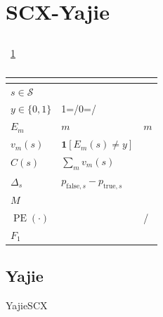 \documentclass[11pt,a4paper]{article}
\DeclareMathOperator{\PE}{PE}
\theoremstyle{remark}
\newcommand{\Sstates}{\mathcal{S}}
\begin{document}
\section{SCX-Yajie}

\subsection{}

~\ref{tab:notation}

\begin{table}[htbp]
\centering
\caption{}
\label{tab:notation}
\begin{tabular}{@{}lll@{}}
\toprule
\textbf{} & \textbf{} & \textbf{} \\
\midrule
$s \in \Sstates$ &  &  \\
$y \in \{0,1\}$ & 1=/0=/ &  \\
$E_m$ & $m$ & $m$ \\
$v_m(s)$ & $\mathbf{1}[E_m(s) \neq y]$ &  \\
$C(s)$ & $\sum_m v_m(s)$ &  \\
$\Delta_s$ & $p_{\text{false},s} - p_{\text{true},s}$ &  \\
$M$ &  &  \\
$\PE(\cdot)$ &  & / \\
$F_1$ &  &  \\
\bottomrule
\end{tabular}
\end{table}

\subsection{Yajie}

YajieSCX\cite{scx2026yajie}
\end{document}
